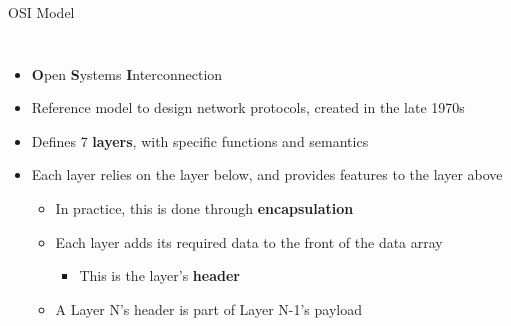 \begin{frame}{OSI Model}
\begin{columns}
	\begin{itemize}
		\item \textbf{O}pen \textbf{S}ystems \textbf{I}nterconnection
		\item Reference model to design network protocols, created in the late 1970s
		\item Defines 7 \textbf{layers}, with specific functions and semantics
		\item Each layer relies on the layer below, and provides features to the layer above
			\begin{itemize}
				\item In practice, this is done through \textbf{encapsulation}
				\item Each layer adds its required data to the front of the data array
					\begin{itemize}
						\item This is the layer's \textbf{header}
					\end{itemize}
				\item A Layer N's header is part of Layer N-1's payload
			\end{itemize}
	\end{itemize}
	\end{columns}
\end{frame}

